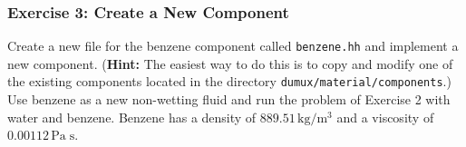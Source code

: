\subsubsection{Exercise 3: Create a New Component}

Create a new file for the benzene component called \texttt{benzene.hh}
and implement a new component. (\textbf{Hint:} The easiest way to do
this is to copy and modify one of the existing components located in
the directory \texttt{dumux/material/components}.) Use benzene as a
new non-wetting fluid and run the problem of Exercise 2 with water and
benzene. Benzene has a density of $889.51 \, \text{kg} / \text{m}^3$
and a viscosity of $0.00112 \, \text{Pa} \; \text{s}$.

\clearpage \newpage

